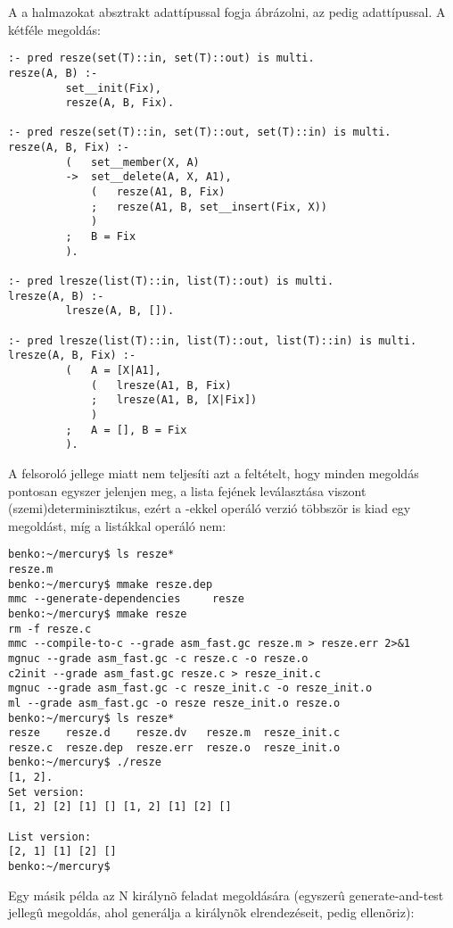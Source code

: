 A  a halmazokat  absztrakt adattípussal fogja ábrázolni,
az  pedig  adattípussal. A kétféle megoldás:

\begin{verbatim}
:- pred resze(set(T)::in, set(T)::out) is multi.
resze(A, B) :-
         set__init(Fix),
         resze(A, B, Fix).

:- pred resze(set(T)::in, set(T)::out, set(T)::in) is multi.
resze(A, B, Fix) :-
         (   set__member(X, A)
         ->  set__delete(A, X, A1),
             (   resze(A1, B, Fix)
             ;   resze(A1, B, set__insert(Fix, X))
             )
         ;   B = Fix
         ).

:- pred lresze(list(T)::in, list(T)::out) is multi.
lresze(A, B) :-
         lresze(A, B, []).

:- pred lresze(list(T)::in, list(T)::out, list(T)::in) is multi.
lresze(A, B, Fix) :-
         (   A = [X|A1],
             (   lresze(A1, B, Fix)
             ;   lresze(A1, B, [X|Fix])
             )
         ;   A = [], B = Fix
         ).
\end{verbatim}

A  felsoroló jellege miatt nem teljesíti azt a feltételt, hogy
minden megoldás pontosan egyszer jelenjen meg, a lista fejének leválasztása viszont
(szemi)determinisztikus, ezért a -ekkel operáló verzió többször is kiad
egy megoldást, míg a listákkal operáló nem:

\begin{verbatim}
benko:~/mercury$ ls resze*
resze.m
benko:~/mercury$ mmake resze.dep
mmc --generate-dependencies     resze
benko:~/mercury$ mmake resze
rm -f resze.c
mmc --compile-to-c --grade asm_fast.gc resze.m > resze.err 2>&1
mgnuc --grade asm_fast.gc -c resze.c -o resze.o
c2init --grade asm_fast.gc resze.c > resze_init.c
mgnuc --grade asm_fast.gc -c resze_init.c -o resze_init.o
ml --grade asm_fast.gc -o resze resze_init.o resze.o     
benko:~/mercury$ ls resze*
resze    resze.d    resze.dv   resze.m  resze_init.c
resze.c  resze.dep  resze.err  resze.o  resze_init.o
benko:~/mercury$ ./resze
[1, 2].
Set version:
[1, 2] [2] [1] [] [1, 2] [1] [2] []

List version:
[2, 1] [1] [2] []
benko:~/mercury$
\end{verbatim}

Egy másik  példa az N királynõ feladat megoldására (egyszerû
generate-and-test jellegû megoldás, ahol  generálja a királynõk
elrendezéseit,  pedig ellenõriz):

